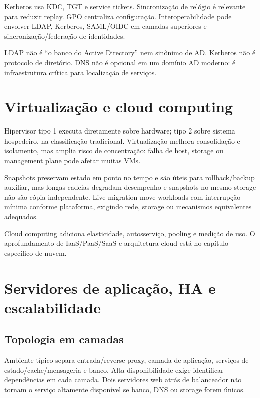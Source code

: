 Kerberos usa KDC, TGT e service tickets. Sincronização de relógio é relevante para reduzir replay. GPO centraliza configuração. Interoperabilidade pode envolver LDAP, Kerberos, SAML/OIDC em camadas superiores e sincronização/federação de identidades.

\begin{cebraspe}
LDAP não é ``o banco do Active Directory'' nem sinônimo de AD. Kerberos não é protocolo de diretório. DNS não é opcional em um domínio AD moderno: é infraestrutura crítica para localização de serviços.
\end{cebraspe}

\section{Virtualização e cloud computing}

Hipervisor tipo 1 executa diretamente sobre hardware; tipo 2 sobre sistema hospedeiro, na classificação tradicional. Virtualização melhora consolidação e isolamento, mas amplia risco de concentração: falha de host, storage ou management plane pode afetar muitas VMs.

Snapshots preservam estado em ponto no tempo e são úteis para rollback/backup auxiliar, mas longas cadeias degradam desempenho e snapshots no mesmo storage não são cópia independente. Live migration move workloads com interrupção mínima conforme plataforma, exigindo rede, storage ou mecanismos equivalentes adequados.

Cloud computing adiciona elasticidade, autosserviço, pooling e medição de uso. O aprofundamento de IaaS/PaaS/SaaS e arquitetura cloud está no capítulo específico de nuvem.

\section{Servidores de aplicação, HA e escalabilidade}

\subsection{Topologia em camadas}

Ambiente típico separa entrada/reverse proxy, camada de aplicação, serviços de estado/cache/mensageria e banco. Alta disponibilidade exige identificar dependências em cada camada. Dois servidores web atrás de balanceador não tornam o serviço altamente disponível se banco, DNS ou storage forem únicos.

